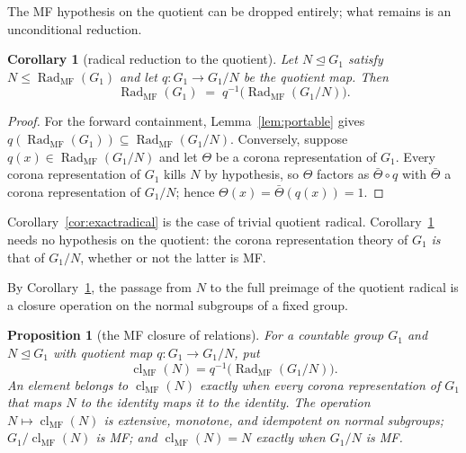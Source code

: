\documentclass[11pt]{amsart}
\newcommand{\leanverified}[2]{\ignorespaces}
\newtheorem{proposition}[theorem]{Proposition}
\newtheorem{corollary}[theorem]{Corollary}
\theoremstyle{definition}
\theoremstyle{remark}
\theoremstyle{plain}
\begin{document}
The MF hypothesis on the quotient can be dropped entirely; what
remains is an unconditional reduction.

\begin{corollary}[radical reduction to the quotient]\label{cor:pullback}
Let $N\trianglelefteq G_1$ satisfy
$N\le\operatorname{Rad}_{\mathrm{MF}}(G_1)$ and let
$q\colon G_1\to G_1/N$ be the quotient map.  Then
\leanverified{Sofic/ManuscriptExactWrappers}{GroupApproximation.ManuscriptExactWrappers.manuscriptRadicalReductionToQuotient}
\[
 \operatorname{Rad}_{\mathrm{MF}}(G_1)
 \;=\;
 q^{-1}\bigl(\operatorname{Rad}_{\mathrm{MF}}(G_1/N)\bigr).
\]
\end{corollary}

\begin{proof}
For the forward containment, Lemma~\ref{lem:portable} gives
$q(\operatorname{Rad}_{\mathrm{MF}}(G_1))
\subseteq\operatorname{Rad}_{\mathrm{MF}}(G_1/N)$.  Conversely, suppose
$q(x)\in\operatorname{Rad}_{\mathrm{MF}}(G_1/N)$ and let $\Theta$ be a
corona representation of $G_1$.  Every corona representation of $G_1$
kills $N$ by hypothesis, so $\Theta$ factors as $\bar\Theta\circ q$
with $\bar\Theta$ a corona representation of $G_1/N$; hence
$\Theta(x)=\bar\Theta(q(x))=1$.
\end{proof}

Corollary~\ref{cor:exactradical} is the case of trivial quotient
radical.  Corollary~\ref{cor:pullback} needs no hypothesis on the
quotient: the corona representation theory of $G_1$ \emph{is} that of
$G_1/N$, whether or not the latter is MF.

By Corollary~\ref{cor:pullback}, the passage from $N$ to the full
preimage of the quotient radical is a closure operation on the normal
subgroups of a fixed group.

\begin{proposition}[the MF closure of relations]\label{prop:mfclosure}
For a countable group $G_1$ and $N\trianglelefteq G_1$ with quotient map
$q\colon G_1\to G_1/N$, put
\[
 \operatorname{cl}_{\mathrm{MF}}(N)
 =q^{-1}\bigl(\operatorname{Rad}_{\mathrm{MF}}(G_1/N)\bigr).
\]
An element belongs to $\operatorname{cl}_{\mathrm{MF}}(N)$ exactly when
every corona representation of $G_1$ that maps $N$ to the identity maps
it to the identity.
\leanverified{Sofic/MFRelationClosure}{GroupApproximation.mem_actualCoronaMFClosure_iff}
The operation $N\mapsto\operatorname{cl}_{\mathrm{MF}}(N)$ is extensive,
monotone, and idempotent on normal subgroups;
$G_1/\operatorname{cl}_{\mathrm{MF}}(N)$ is MF; and
$\operatorname{cl}_{\mathrm{MF}}(N)=N$ exactly when $G_1/N$ is MF.
\leanverified{Sofic/MFRelationClosure}{GroupApproximation.manuscriptRelationClosure}
\end{proposition}
\end{document}
